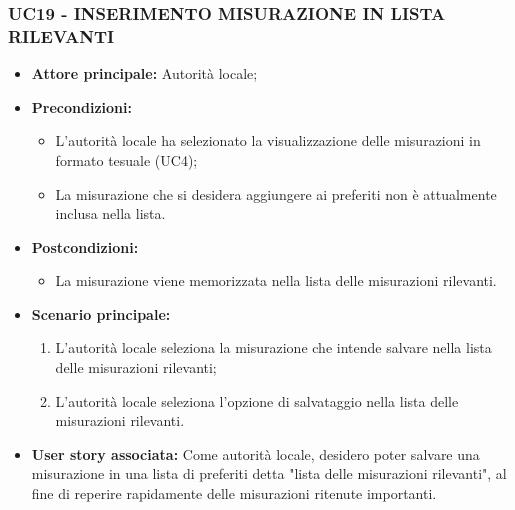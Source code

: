 \subsubsection{UC19 - INSERIMENTO MISURAZIONE IN LISTA RILEVANTI}
\begin{itemize}
    \item \textbf{Attore principale:} Autorità locale;
    \item \textbf{Precondizioni:}
          \begin{itemize}
            \item L'autorità locale ha selezionato la visualizzazione delle misurazioni in formato tesuale (UC4);
            \item La misurazione che si desidera aggiungere ai preferiti non è attualmente inclusa nella lista.
          \end{itemize}
    \item \textbf{Postcondizioni:}
          \begin{itemize}
              \item La misurazione viene memorizzata nella lista delle misurazioni rilevanti.
          \end{itemize}
    \item \textbf{Scenario principale:}
          \begin{enumerate}
            \item L'autorità locale seleziona la misurazione che intende salvare nella lista delle misurazioni rilevanti;
            \item L'autorità locale seleziona l'opzione di salvataggio nella lista delle misurazioni rilevanti.
          \end{enumerate}
    \item \textbf{User story associata:}
        Come autorità locale, desidero poter salvare una misurazione in una lista di preferiti detta "lista delle misurazioni rilevanti", al fine di reperire rapidamente delle misurazioni ritenute importanti.
\end{itemize}